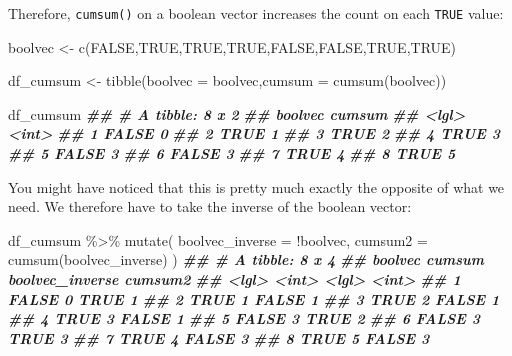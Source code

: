 \documentclass[
]{book}
\newenvironment{Shaded}{\begin{snugshade}}{\end{snugshade}}
\newcommand{\AttributeTok}[1]{\textcolor[rgb]{0.77,0.63,0.00}{#1}}
\newcommand{\ConstantTok}[1]{\textcolor[rgb]{0.00,0.00,0.00}{#1}}
\newcommand{\DocumentationTok}[1]{\textcolor[rgb]{0.56,0.35,0.01}{\textbf{\textit{#1}}}}
\newcommand{\FunctionTok}[1]{\textcolor[rgb]{0.00,0.00,0.00}{#1}}
\newcommand{\NormalTok}[1]{#1}
\newcommand{\OtherTok}[1]{\textcolor[rgb]{0.56,0.35,0.01}{#1}}
\newcommand{\SpecialCharTok}[1]{\textcolor[rgb]{0.00,0.00,0.00}{#1}}
\begin{document}
Therefore, \texttt{cumsum()} on a boolean vector increases the count on each \texttt{TRUE} value:

\begin{Shaded}
\begin{Highlighting}[]

\NormalTok{boolvec }\OtherTok{\textless{}{-}} \FunctionTok{c}\NormalTok{(}\ConstantTok{FALSE}\NormalTok{,}\ConstantTok{TRUE}\NormalTok{,}\ConstantTok{TRUE}\NormalTok{,}\ConstantTok{TRUE}\NormalTok{,}\ConstantTok{FALSE}\NormalTok{,}\ConstantTok{FALSE}\NormalTok{,}\ConstantTok{TRUE}\NormalTok{,}\ConstantTok{TRUE}\NormalTok{)}

\NormalTok{df\_cumsum }\OtherTok{\textless{}{-}} \FunctionTok{tibble}\NormalTok{(}\AttributeTok{boolvec =}\NormalTok{ boolvec,}\AttributeTok{cumsum =} \FunctionTok{cumsum}\NormalTok{(boolvec))}

\NormalTok{df\_cumsum}
\DocumentationTok{\#\# \# A tibble: 8 x 2}
\DocumentationTok{\#\#   boolvec cumsum}
\DocumentationTok{\#\#   \textless{}lgl\textgreater{}    \textless{}int\textgreater{}}
\DocumentationTok{\#\# 1 FALSE        0}
\DocumentationTok{\#\# 2 TRUE         1}
\DocumentationTok{\#\# 3 TRUE         2}
\DocumentationTok{\#\# 4 TRUE         3}
\DocumentationTok{\#\# 5 FALSE        3}
\DocumentationTok{\#\# 6 FALSE        3}
\DocumentationTok{\#\# 7 TRUE         4}
\DocumentationTok{\#\# 8 TRUE         5}
\end{Highlighting}
\end{Shaded}

You might have noticed that this is pretty much exactly the opposite of what we need. We therefore have to take the inverse of the boolean vector:

\begin{Shaded}
\begin{Highlighting}[]

\NormalTok{df\_cumsum }\SpecialCharTok{\%\textgreater{}\%}
  \FunctionTok{mutate}\NormalTok{(}
    \AttributeTok{boolvec\_inverse =} \SpecialCharTok{!}\NormalTok{boolvec,}
    \AttributeTok{cumsum2 =} \FunctionTok{cumsum}\NormalTok{(boolvec\_inverse)}
\NormalTok{  )}
\DocumentationTok{\#\# \# A tibble: 8 x 4}
\DocumentationTok{\#\#   boolvec cumsum boolvec\_inverse cumsum2}
\DocumentationTok{\#\#   \textless{}lgl\textgreater{}    \textless{}int\textgreater{} \textless{}lgl\textgreater{}             \textless{}int\textgreater{}}
\DocumentationTok{\#\# 1 FALSE        0 TRUE                  1}
\DocumentationTok{\#\# 2 TRUE         1 FALSE                 1}
\DocumentationTok{\#\# 3 TRUE         2 FALSE                 1}
\DocumentationTok{\#\# 4 TRUE         3 FALSE                 1}
\DocumentationTok{\#\# 5 FALSE        3 TRUE                  2}
\DocumentationTok{\#\# 6 FALSE        3 TRUE                  3}
\DocumentationTok{\#\# 7 TRUE         4 FALSE                 3}
\DocumentationTok{\#\# 8 TRUE         5 FALSE                 3}
\end{Highlighting}
\end{Shaded}
\end{document}

